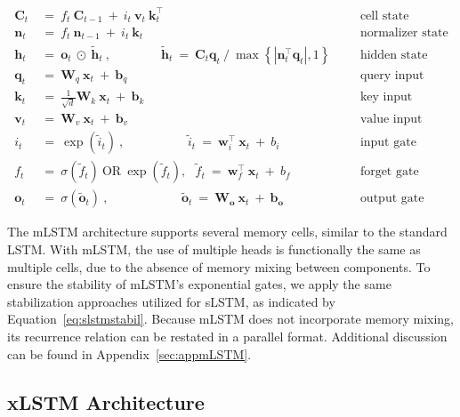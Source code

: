 \begin{align}
\label{eq:mlstm_recurrent_begin}
\mathbf{C}_t \ &= \  f_t \ \mathbf{C}_{t-1} \ + \ 
  i_t \ \mathbf{v}_t \ \mathbf{k}_t^\top & &  &\text{cell state} \\
\mathbf{n}_t \ &= \  f_t \ \mathbf{n}_{t-1} \ + \ 
  i_t \ \mathbf{k}_t & &  &\text{normalizer state} \\
\mathbf{h}_t  \ &= \ \mathbf{o}_t \ \odot \ \tilde{\mathbf{h}}_t
\ , \qquad \qquad 
\tilde{\mathbf{h}}_t \ = \   \mathbf{C}_t \mathbf{q}_t \ / \ 
  \max \left\{ |\mathbf{n}_t^\top \mathbf{q}_t|, 1 \right\} 
   &&&\text{hidden state} \\
\mathbf{q}_t \ &= \ \mathbf{W}_q \ \mathbf{x}_t \ + \ \mathbf{b}_q  & &  &\text{query input} \\
\mathbf{k}_t \ &= \ \frac{1}{\sqrt{d}} \mathbf{W}_k \ \mathbf{x}_t \ + \ \mathbf{b}_k  & &  &\text{key input} \\
\mathbf{v}_t \ &= \ \mathbf{W}_v \ \mathbf{x}_t \ + \ \mathbf{b}_v  & &  &\text{value input} \\
i_t \ &= \ \!\exp \!  \! \left( \tilde{i}_t  \right) \ , 
 \qquad \qquad \ \ \ \ \,
  \tilde{i}_t \ = \ \mathbf{w}^\top_{i} \ \mathbf{x}_t \ + \  b_{i} \ \ \ 
  &&&\text{input gate} \\
f_t \ &= \ \sigma \!  \left(  \tilde{f}_t \right) \ \text{OR} \ \!\exp \!  \! \left(  \tilde{f}_t \right) , \ \ \: \!
\tilde{f}_t \ = \ \mathbf{w}^\top_{f} \ \mathbf{x}_t  \ + \
  b_{f}
  &&& \text{forget gate} \\
\label{eq:mlstm_recurrent_end}
\mathbf{o}_t \ &= \ \sigma \left( \tilde{\mathbf{o}}_t \right) \ , \qquad \qquad \quad \ \ \ \,
  \tilde{\mathbf{o}}_t  \ = \ \mathbf{W}_{\mathbf{o}} \ \mathbf{x}_t \ + \
  \mathbf{b}_{\mathbf{o}}
  &&&\text{output gate} 
\end{align}

The mLSTM architecture supports several memory cells, similar to the standard LSTM. With mLSTM, the use of multiple heads is functionally the same as multiple cells, due to the absence of memory mixing between components. To ensure the stability of mLSTM’s exponential gates, we apply the same stabilization approaches utilized for sLSTM, as indicated by Equation~\ref{eq:slstmstabil}. Because mLSTM does not incorporate memory mixing, its recurrence relation can be restated in a parallel format. Additional discussion can be found in Appendix~\ref{sec:appmLSTM}.

\subsection{xLSTM Architecture}
\label{sec:xLSTMarch}

